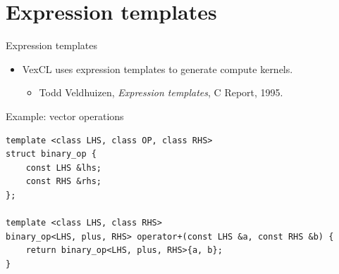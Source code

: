 \documentclass[@BEAMER_OPTIONS@]{beamer}
\newcommand{\CXX}{{\rm C}\plusplus}
\begin{document}
\section{Expression templates}

\begin{frame}[fragile]{Expression templates}
    \begin{itemize}
        \item VexCL uses expression templates to generate compute kernels.
            \begin{itemize}
                \item Todd Veldhuizen, \emph{Expression templates}, \CXX
                    Report, 1995.
            \end{itemize}
    \end{itemize}
    \begin{exampleblock}{Example: vector operations}
        \begin{lstlisting}
template <class LHS, class OP, class RHS>
struct binary_op {
    const LHS &lhs;
    const RHS &rhs;
};

template <class LHS, class RHS>
binary_op<LHS, plus, RHS> operator+(const LHS &a, const RHS &b) {
    return binary_op<LHS, plus, RHS>{a, b};
}
        \end{lstlisting}
    \end{exampleblock}
\end{frame}
\end{document}
